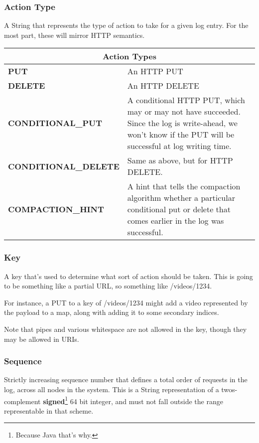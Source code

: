 \documentclass[11pt]{article}
\begin{document}
\subsubsection{Action Type}
A String that represents the type of action to take for a given log entry.  For the most part, these will mirror HTTP semantics.

\begin{center}
\begin{tabular}{|l|p{3.5in}|}
\hline
\multicolumn{2}{|c|}{Action  Types}\\ \hline
\textbf{PUT} & An HTTP PUT\\ \hline
\textbf{DELETE} & An HTTP DELETE\\ \hline
\textbf{CONDITIONAL\_PUT} & A conditional HTTP PUT, which may or may not have succeeded.   Since the log is write-ahead, we won’t know if the PUT will be successful at log writing time.\\ \hline
\textbf{CONDITIONAL\_DELETE} & Same as above, but for HTTP DELETE.\\ \hline
\textbf{COMPACTION\_HINT} & A hint that tells the compaction algorithm whether a particular conditional put or delete that comes earlier in the log was successful.\\ \hline
\end{tabular}
\end{center}

\subsubsection{Key}
A key that’s used to determine what sort of action should be taken.  This is going to be something like a partial URL, so something like /videos/1234.

For instance, a PUT to a key of /videos/1234 might add a video represented by the payload to a map, along with adding it to some secondary indices.  

Note that pipes and various whitespace are not allowed in the key, though they may be allowed in URIs.

\subsubsection{Sequence}
Strictly increasing sequence number that defines a total order of requests in the log, across all nodes in the system.  This is a String representation of a twos-complement \textbf{signed}\footnote{Because Java that’s why.} 64 bit integer, and must not fall outside the range representable in that scheme.
\end{document}
